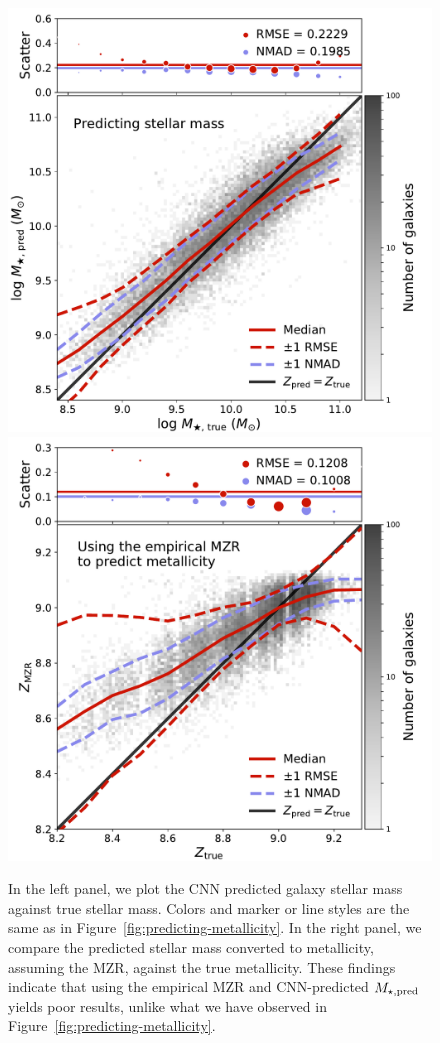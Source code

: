 \documentclass[fleqn,usenatbib]{mnras}
\begin{document}
\begin{figure}
	\includegraphics[width=\columnwidth]{05-a-prediction_mass.pdf}
	\includegraphics[width=\columnwidth]{05-b-prediction_mzr.pdf}
	\caption{\label{fig:mass-metallicity}
		In the left panel, we plot the CNN predicted galaxy stellar mass against true stellar mass. Colors and marker or line styles are the same as in Figure~\ref{fig:predicting-metallicity}. In the right panel, we compare the predicted stellar mass converted to metallicity, assuming the \citet{Tremonti2004} MZR, against the true metallicity.
		These findings indicate that using the empirical MZR and CNN-predicted $M_{\star,\rm pred}$ yields poor results, unlike what we have observed in Figure~\ref{fig:predicting-metallicity}.
		}
\end{figure}
\end{document}
